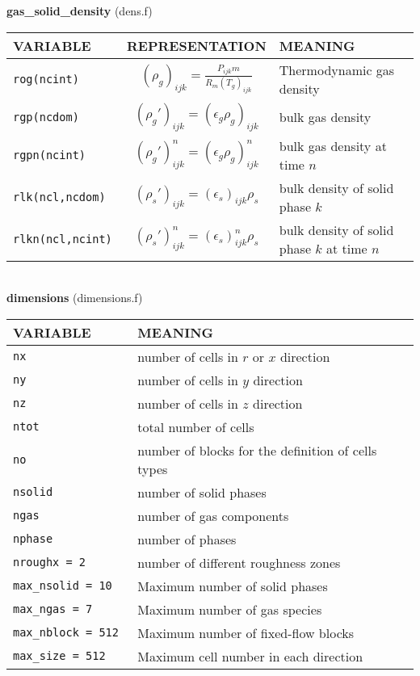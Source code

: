 %
%
{\large {\bf gas\_solid\_density}} (dens.f)\\[5mm]
\begin{tabular}{|p{6cm}|c|p{6cm}|}\hline
VARIABLE & REPRESENTATION & MEANING\\\hline
\tt rog(ncint) & $(\rho_g)_{ijk}=\frac{P_{ijk}m}{R_m(T_g)_{ijk}}$ &  Thermodynamic gas density \\\hline
\tt rgp(ncdom) & $(\rho_g')_{ijk}=(\epsilon_g\rho_g)_{ijk} $&  bulk gas density \\\hline
\tt rgpn(ncint) & $(\rho_g')^{n}_{ijk}=(\epsilon_g\rho_g)^{n}_{ijk} $&  bulk gas density at time $n$ \\\hline
\tt rlk(ncl,ncdom) & $(\rho_s')_{ijk}=(\epsilon_s)_{ijk}\rho_s$ &  bulk density of solid phase $k$ \\\hline
\tt rlkn(ncl,ncint) & $(\rho_s')^{n}_{ijk}=(\epsilon_s)^{n}_{ijk}\rho_s$ &  bulk density of solid phase $k$ at time $n$\\\hline
\end{tabular}\\[5mm]
%
%
{\large {\bf dimensions}} (dimensions.f)\\[5mm]
\begin{tabular}{|p{6cm}|p{6cm}|}\hline
VARIABLE & MEANING\\\hline
\tt  nx    & number of cells in $r$ or $x$ direction\\\hline
\tt  ny    & number of cells in $y$ direction\\\hline
\tt  nz    & number of cells in $z$ direction\\\hline
\tt  ntot  & total number of cells \\\hline
\tt  no   & number of blocks for the definition of cells types\\\hline
\tt  nsolid    & number of solid phases\\\hline
\tt  ngas   & number of gas components\\\hline
\tt  nphase & number of phases\\\hline
\tt  nroughx = 2 & number of different roughness zones\\\hline
\tt  max\_nsolid = 10 & Maximum number of solid phases\\\hline
\tt  max\_ngas = 7 & Maximum number of gas species \\\hline
\tt  max\_nblock = 512 & Maximum number of fixed-flow blocks\\\hline
\tt  max\_size = 512 & Maximum cell number in each direction\\\hline
\end{tabular}\\[5mm]
